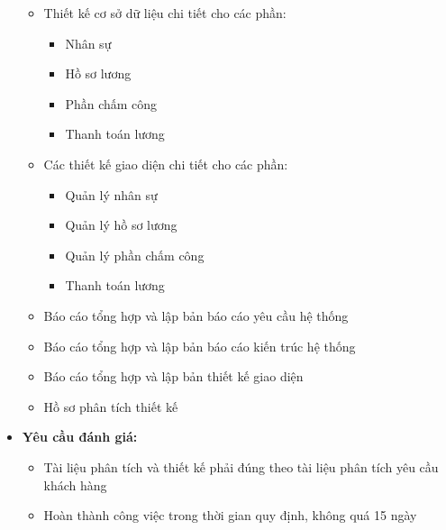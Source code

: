 \begin{itemize}
\begin{itemize}
              \item Thiết kế cơ sở dữ liệu chi tiết cho các phần:
                    \begin{itemize}
                        \item Nhân sự
                        \item Hồ sơ lương
                        \item Phần chấm công
                        \item Thanh toán lương
                    \end{itemize}
              \item Các thiết kế giao diện chi tiết cho các phần:
                    \begin{itemize}
                        \item Quản lý nhân sự
                        \item Quản lý hồ sơ lương
                        \item Quản lý phần chấm công
                        \item Thanh toán lương
                    \end{itemize}
              \item Báo cáo tổng hợp và lập bản báo cáo yêu cầu hệ thống
              \item Báo cáo tổng hợp và lập bản báo cáo kiến trúc hệ thống
              \item Báo cáo tổng hợp và lập bản thiết kế giao diện
              \item Hồ sơ phân tích thiết kế
          \end{itemize}
    \item \textbf{Yêu cầu đánh giá:}
    \begin{itemize}
        \item Tài liệu phân tích và thiết kế phải đúng theo tài liệu phân tích yêu cầu khách hàng
        \item Hoàn thành công việc trong thời gian quy định, không quá 15 ngày
    \end{itemize}
\end{itemize}
